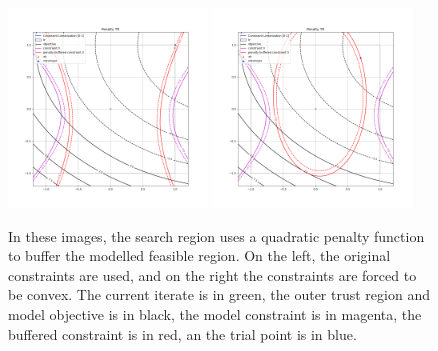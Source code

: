 \begin{figure}[ht]
    \centering
    \includegraphics[width=200px]{images/penalty_tr_0.png}
    \includegraphics[width=200px]{images/penalty_tr_1.png}
    \caption[The quadratic buffered region.] {
		In these images, the search region uses a quadratic penalty function to buffer the modelled feasible region.
		On the left, the original constraints are used, and on the right the constraints are forced to be convex.
		The current iterate is in green,
		the outer trust region and model objective is in black,
		the model constraint is in magenta,
		the buffered constraint is in red,
		an the trial point is in blue.
    }
    \label{quadratic_penalty}
\end{figure}


